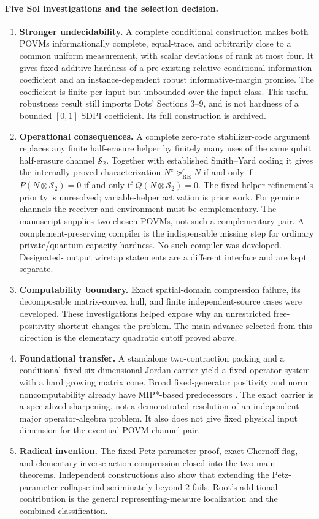 \documentclass[11pt]{article}
\newcommand{\RE}{\mathrm{RE}}
\begin{document}
\paragraph{Five Sol investigations and the selection decision.}
\begin{enumerate}
\item \textbf{Stronger undecidability.} A complete conditional construction makes
both POVMs informationally complete, equal-trace, and arbitrarily close to a
common uniform measurement, with scalar deviations of rank at most four. It
gives fixed-additive hardness of a pre-existing relative conditional information
coefficient and an instance-dependent robust informative-margin promise.
The coefficient is finite per input but unbounded over the input class.
This useful robustness result still imports Dots' Sections 3--9, and is not
hardness of a bounded $[0,1]$ SDPI coefficient. Its full construction is archived.
\item \textbf{Operational consequences.} A complete zero-rate stabilizer-code
argument replaces any finite half-erasure helper by finitely many uses of the
same qubit half-erasure channel $\mathcal S_2$. Together with established
Smith--Yard coding \cite{smithyard} it gives the internally proved characterization
$N^c\succeq^c_{\RE}N$ if and only if
$P(N\otimes\mathcal S_2)=0$ if and only if $Q(N\otimes\mathcal S_2)=0$.
The fixed-helper refinement's priority is unresolved; variable-helper
activation is prior work. For genuine channels the receiver and environment
must be complementary. The
manuscript supplies two chosen POVMs, not such a complementary pair. A
complement-preserving compiler is the indispensable missing step for ordinary
private/quantum-capacity hardness. No such compiler was developed. Designated-
output wiretap statements are a different interface and are kept separate.
\item \textbf{Computability boundary.} Exact spatial-domain compression failure,
its decomposable matrix-convex hull, and finite independent-source cases were
developed. These investigations helped expose why an unrestricted free-
positivity shortcut changes the problem. The main advance selected from this
direction is the elementary quadratic cutoff proved above.
\item \textbf{Foundational transfer.} A standalone two-contraction packing and a
conditional fixed six-dimensional Jordan carrier yield a fixed operator system
with a hard growing matrix cone. Broad fixed-generator positivity and norm
noncomputability already have MIP*-based predecessors \cite{mehta,goldbring}.
The exact carrier is a specialized sharpening, not a demonstrated resolution
of an independent major operator-algebra problem. It also does not give fixed
physical input dimension for the eventual POVM channel pair.
\item \textbf{Radical invention.} The fixed Petz-parameter proof, exact Chernoff
flag, and elementary inverse-action compression closed into the two main
theorems. Independent constructions also show that extending the Petz-parameter
collapse indiscriminately beyond $2$ fails. Root's additional contribution is
the general representing-measure localization and the combined classification.
\end{enumerate}
\end{document}
